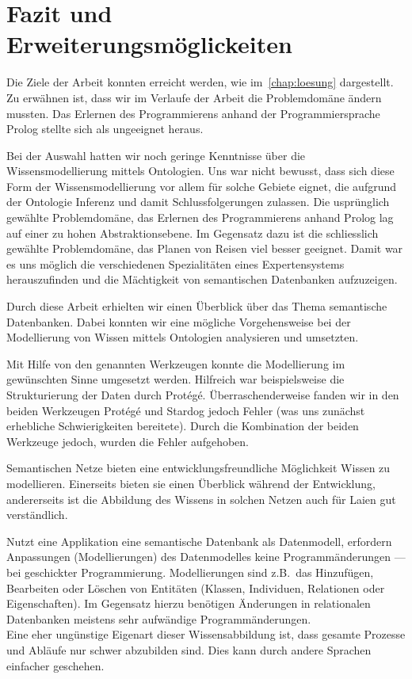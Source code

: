 \chapter{Fazit und Erweiterungsmöglickeiten}
\label{chap:fazit}


Die Ziele der Arbeit konnten erreicht werden, wie im~\autoref{chap:loesung} dargestellt. Zu erwähnen ist, dass wir im Verlaufe der Arbeit die Problemdomäne ändern mussten. Das Erlernen des Programmierens anhand der Programmiersprache Prolog stellte sich als ungeeignet heraus.

Bei der Auswahl hatten wir noch geringe Kenntnisse über die Wissensmodellierung mittels Ontologien. Uns war nicht bewusst, dass sich diese Form der Wissensmodellierung vor allem für solche Gebiete eignet, die aufgrund der Ontologie Inferenz und damit Schlussfolgerungen zulassen. Die usprünglich gewählte Problemdomäne, das Erlernen des Programmierens anhand Prolog lag auf einer zu hohen Abstraktionsebene. Im Gegensatz dazu ist die schliesslich gewählte Problemdomäne, das Planen von Reisen viel besser geeignet. Damit war es uns möglich die verschiedenen Spezialitäten eines Expertensystems herauszufinden und die Mächtigkeit von semantischen Datenbanken aufzuzeigen.

Durch diese Arbeit erhielten wir einen Überblick über das Thema semantische Datenbanken. Dabei konnten wir eine mögliche Vorgehensweise bei der Modellierung von Wissen mittels Ontologien analysieren und umsetzten.

Mit Hilfe von den genannten Werkzeugen konnte die Modellierung im gewünschten Sinne umgesetzt werden. Hilfreich war beispielsweise die Strukturierung der Daten durch Protégé.
Überraschenderweise fanden wir in den beiden Werkzeugen Protégé und Stardog jedoch Fehler (was uns zunächst erhebliche Schwierigkeiten bereitete). Durch die Kombination der beiden Werkzeuge jedoch, wurden die Fehler aufgehoben.

Semantischen Netze bieten eine entwicklungsfreundliche Möglichkeit Wissen zu modellieren. Einerseits bieten sie einen Überblick während der Entwicklung, andererseits ist die Abbildung des Wissens in solchen Netzen auch für Laien gut verständlich.

Nutzt eine Applikation eine semantische Datenbank als Datenmodell, erfordern Anpassungen (Modellierungen) des Datenmodelles keine Programmänderungen --- bei geschickter Programmierung. Modellierungen sind z.B.\ das Hinzufügen, Bearbeiten oder Löschen von Entitäten (Klassen, Individuen, Relationen oder Eigenschaften). Im Gegensatz hierzu benötigen Änderungen in relationalen Datenbanken meistens sehr aufwändige Programmänderungen.\\
Eine eher ungünstige Eigenart dieser Wissensabbildung ist, dass gesamte Prozesse und Abläufe nur schwer abzubilden sind. Dies kann durch andere Sprachen einfacher geschehen.

